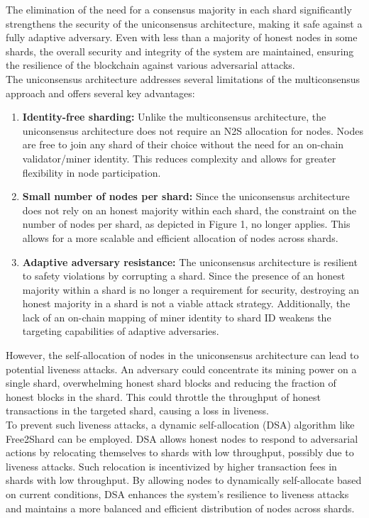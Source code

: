 The elimination of the need for a consensus majority in each shard significantly strengthens the security of the uniconsensus architecture, making it safe against a fully adaptive adversary. Even with less than a majority of honest nodes in some shards, the overall security and integrity of the system are maintained, ensuring the resilience of the blockchain against various adversarial attacks.\\
The uniconsensus architecture addresses several limitations of the multiconsensus approach and offers several key advantages:
\begin{enumerate}
	\item \textbf{Identity-free sharding:} Unlike the multiconsensus architecture, the uniconsensus architecture does not require an N2S allocation for nodes. Nodes are free to join any shard of their choice without the need for an on-chain validator/miner identity. This reduces complexity and allows for greater flexibility in node participation.
	\item \textbf{Small number of nodes per shard:} Since the uniconsensus architecture does not rely on an honest majority within each shard, the constraint on the number of nodes per shard, as depicted in Figure 1, no longer applies. This allows for a more scalable and efficient allocation of nodes across shards.
	\item \textbf{Adaptive adversary resistance:} The uniconsensus architecture is resilient to safety violations by corrupting a shard. Since the presence of an honest majority within a shard is no longer a requirement for security, destroying an honest majority in a shard is not a viable attack strategy. Additionally, the lack of an on-chain mapping of miner identity to shard ID weakens the targeting capabilities of adaptive adversaries.
\end{enumerate}
However, the self-allocation of nodes in the uniconsensus architecture can lead to potential liveness attacks. An adversary could concentrate its mining power on a single shard, overwhelming honest shard blocks and reducing the fraction of honest blocks in the shard. This could throttle the throughput of honest transactions in the targeted shard, causing a loss in liveness.\\
To prevent such liveness attacks, a dynamic self-allocation (DSA) algorithm like Free2Shard can be employed. DSA allows honest nodes to respond to adversarial actions by relocating themselves to shards with low throughput, possibly due to liveness attacks. Such relocation is incentivized by higher transaction fees in shards with low throughput. By allowing nodes to dynamically self-allocate based on current conditions, DSA enhances the system's resilience to liveness attacks and maintains a more balanced and efficient distribution of nodes across shards.
